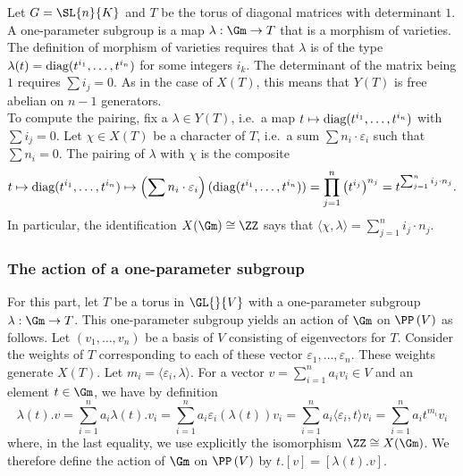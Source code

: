 \begin{exmp}\label{ex:1-psg}
    Let $G = \SL{n}{K}$ and $T$ be the torus of diagonal matrices with determinant $1$. A one-parameter subgroup is a map $\lambda: \Gm \to T$ that is a morphism of varieties. The definition of morphism of varieties requires that $\lambda$ is of the type $\lambda(t) = \textnormal{diag}(t^{i_1}, \ldots, t^{i_n})$ for some integers $i_k$. The determinant of the matrix being $1$ requires $\sum i_j = 0$. As in the case of $X(T)$, this means that $Y(T)$ is free abelian on $n-1$ generators.\\
    To compute the pairing, fix a $\lambda \in Y(T)$, i.e.~a map $t \mapsto \textnormal{diag}(t^{i_1}, \ldots, t^{i_n})$ with $\sum i_j = 0$. Let $\chi \in X(T)$ be a character of $T$, i.e.~a sum $\sum n_i \cdot \varepsilon_i$ such that $\sum n_i = 0$. The pairing of $\lambda$ with $\chi$ is the composite
    \[ t \mapsto \textnormal{diag}(t^{i_1}, \ldots, t^{i_n}) \mapsto \left(\sum n_i \cdot \varepsilon_i\right) (\textnormal{diag}(t^{i_1}, \ldots, t^{i_n})) = \prod_{j = 1}^{n}{\left(t^{i_j}\right)}^{n_j} = t^{\sum_{j=1}^{n} i_j \cdot n_j}.\]
    In particular, the identification $X(\Gm) \cong \ZZ$ says that $\langle \chi, \lambda\rangle = \sum_{j=1}^{n} i_j \cdot n_j$.
\end{exmp}

\subsubsection[The action of a one-parameter subgroup]{The action of a one-parameter subgroup~\cite[Section~25.1]{humphreys_linear_1975}}

For this part, let $T$ be a torus in $\GL{}{V}$ with a one-parameter subgroup $\lambda: \Gm \to T$. 
This one-parameter subgroup yields an action of $\Gm$ on $\PP\left(V\right)$ as follows. 
Let $(v_1, \ldots, v_n)$ be a basis of $V$ consisting of eigenvectors for $T$. 
Consider the weights of $T$ corresponding to each of these vector $\varepsilon_1, \ldots, \varepsilon_n$. 
These weights generate $X(T)$. 
Let $m_i = \langle \varepsilon_i, \lambda \rangle$. 
For a vector $v = \sum_{i = 1}^{n} a_i v_i \in V$ and an element $t \in \Gm$, we have by definition
\[ \lambda(t).v = \sum_{i = 1}^n a_i \lambda(t).v_i = \sum_{i = 1}^n a_i \varepsilon_i ( \lambda(t)) v_i = \sum_{i = 1}^n a_i \langle \varepsilon_i, t \rangle v_i = \sum_{i = 1}^n a_i t^{m_i} v_i \]
where, in the last equality, we use explicitly the isomorphism $\ZZ \cong X(\Gm)$. We therefore define the action of $\Gm$ on $\PP\left(V\right)$ by $t . [v] = [\lambda(t). v]$.

